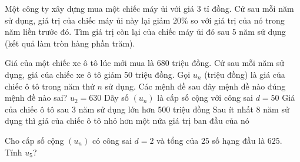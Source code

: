 \begin{ex}  %
	Một công ty xây dựng mua một chiếc máy ủi với giá $3$ tỉ đồng. Cứ sau mỗi năm sử dụng, giá trị của chiếc máy ủi này lại giảm $20 \%$ so với giá trị của nó trong năm liền trước đó. Tìm giá trị còn lại của chiếc máy ủi đó sau $5$ năm sử dụng (kết quả làm tròn hàng phần trăm).
\end{ex}

\begin{ex} %
	Giá của một chiếc xe ô tô lúc mới mua là 680 triệu đồng. Cứ sau mỗi năm sử dụng, giá của chiếc xe ô tô giảm 50 triệu đồng. Gọi $u_n$ (triệu đồng) là giá của chiếc ô tô trong năm thứ $n$ sử dụng. Các mệnh đề sau đây mệnh đề nào đúng mệnh đề nào sai?
	\choiceTF
	{\True $ u_2=630$}
	{Dãy số $( u_n )$ là cấp số cộng với công sai $ d=50$}
	{\True Giá của chiếc ô tô sau 3 năm sử dụng lớn hơn 500 triệu đồng}
	{Sau ít nhất 8 năm sử dụng thì giá của chiếc ô tô nhỏ hơn một nửa giá trị ban đầu của nó}
\end{ex}

\begin{ex} %
	Cho cấp số cộng $(u_n)$ có công sai $ d=2$ và tổng của $25$ số hạng đầu là $625$. Tính $ u_5$?
\end{ex}

